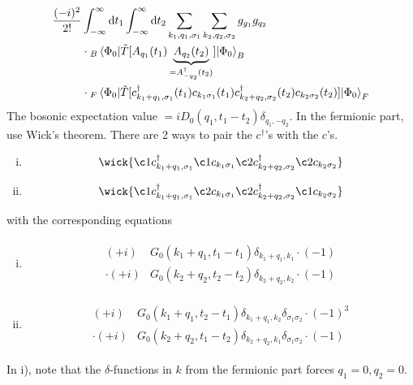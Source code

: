 \begin{align*} 
\frac{(-i)^2}{2!}&\int_{-\infty}^\infty\dd{t_1}\int_{-\infty}^\infty\dd{t_2}\sum_{k_1, q_1, \sigma_1}\sum_{k_2, q_2, \sigma_2}g_{g_1}g_{q_2}\\
&\cdot{}_B\ev{\tilde{T}[A_{q_1}(t_1)\underbrace{A_{q_2}(t_2)}_{=A_{-q_2}^\dagger(t_2)}]}{\Phi_0}_B \\
&\cdot {}_F\ev{\tilde{T}[c_{k_1+q_1, \sigma_1}^\dagger(t_1) c_{k_1\sigma_1}(t_1) c_{k_2+q_2, \sigma_2}^\dagger(t_2) c_{k_2\sigma_2}(t_2)]}{\Phi_0}_F
\end{align*}
The bosonic expectation value $= iD_0(q_1, t_1-t_2)\delta_{q_1, -q_2}$. In the fermionic part, use Wick's theorem. There are 2 ways to pair the $c^\dagger$'s with the $c$'s.
\begin{enumerate}[i)]
	\item \begin{equation}
		\wick{\c1 c_{k_1+q_1, \sigma_1}^\dagger \c1 c_{k_1\sigma_1} \c2 c_{k_2+q_2, \sigma_2}^\dagger \c2 c_{k_2\sigma_2}}
	\end{equation}
	\item \begin{equation}
	\wick{\c1 c_{k_1+q_1, \sigma_1}^\dagger \c2 c_{k_1\sigma_1} \c2 c_{k_2+q_2, \sigma_2}^\dagger \c1 c_{k_2\sigma_2}}
	\end{equation}
\end{enumerate}
with the corresponding equations
\begin{enumerate}[i)]
	\item \begin{align}
	\begin{split} 
	(+i)&G_0(k_1+q_1, t_1-t_1)\delta_{k_1+q_1,k_1}\cdot(-1)\\
	\cdot(+i)&G_0(k_2+q_2, t_2-t_2)\delta_{k_2+q_2,k_2}\cdot(-1)
	\end{split}	
	\end{align}
	
	\item 
	\begin{align}
	\begin{split} 
	(+i)&G_0(k_1+q_1, t_2-t_1)\delta_{k_1+q_1,k_2}\delta_{\sigma_1\sigma_2}\cdot(-1)^3\\
	\cdot(+i)&G_0(k_2+q_2, t_1-t_2)\delta_{k_2+q_2,k_1}\delta_{\sigma_1\sigma_2}\cdot(-1)
	\end{split}	
	\end{align}
\end{enumerate}
In i), note that the $\delta$-functions in $k$ from the fermionic part forces $q_1 =0, q_2 = 0$.
